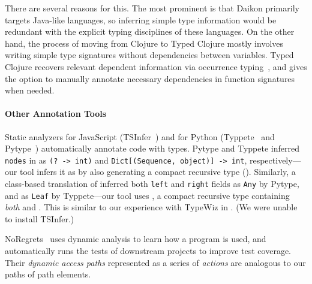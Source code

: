 There are several reasons for this. The most prominent is that Daikon
primarily targets Java-like languages, so inferring simple type information
would be redundant with the explicit typing disciplines of these languages.
On the other hand, the process of moving from Clojure to Typed Clojure
mostly involves writing simple type signatures without dependencies
between variables. Typed Clojure recovers relevant dependent information
via occurrence typing~\cite{TF10}, and gives the option to manually annotate necessary
dependencies in function signatures when needed.


\paragraph{Other Annotation Tools}
Static analyzers
for JavaScript
(TSInfer~\cite{kristensen2017inference}) and for Python (Typpete~\cite{typette18}
and Pytype~\cite{pytype})
automatically annotate code with types.
Pytype and Typpete inferred \texttt{nodes} in 
as \texttt{(? -> int)}
and \texttt{Dict[(Sequence, object)] -> int}, respectively---our tool 
infers it as \clj{[Op -> Int]} by also generating a compact recursive
type ().
Similarly, a class-based translation of 
inferred both \texttt{left} and \texttt{right}
fields
as \texttt{Any} by Pytype, and as \texttt{Leaf} by Typpete---our tool
uses ,
a compact recursive type containing \emph{both}  and .
This is similar to our experience with TypeWiz in .
(We were unable to install TSInfer.)

NoRegrets~\cite{noregrets2018} uses dynamic analysis to learn how a program
is used, and automatically runs the tests of downstream projects to
improve test coverage.
Their \emph{dynamic access paths} represented as
a series of \emph{actions} are analogous to our paths of path elements.



